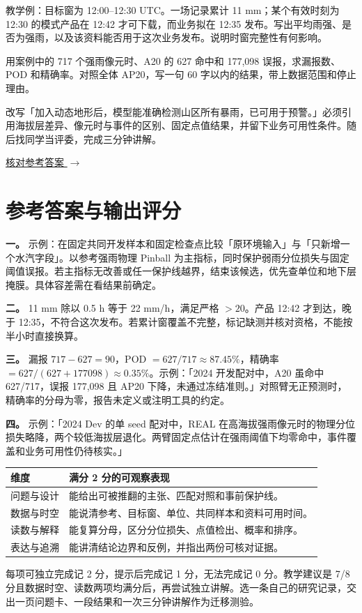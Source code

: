 教学例：目标窗为 12:00--12:30 UTC。一场记录累计 11 mm；某个有效时刻为 12:30 的模式产品在 12:42 才可下载，而业务拟在 12:35 发布。写出平均雨强、是否为强雨，以及该资料能否用于这次业务发布。说明时窗完整性有何影响。

用案例中的 717 个强雨像元时、A20 的 627 命中和 177,098 误报，求漏报数、POD 和精确率。对照全体 AP20，写一句 60 字以内的结果，带上数据范围和停止理由。

改写「加入动态地形后，模型能准确检测山区所有暴雨，已可用于预警。」必须引用海拔层差异、像元时与事件的区别、固定点值结果，并留下业务可用性条件。随后找同学当评委，完成三分钟讲解。

\bigskip
\hyperlink{answers}{核对参考答案 $\rightarrow$}

\clearpage
\hypertarget{answers}{}
\section*{参考答案与输出评分}
\textbf{一。} 示例：在固定共同开发样本和固定检查点比较「原环境输入」与「只新增一个水汽字段」。以参考强雨物理 Pinball 为主指标，同时保护弱雨分位损失与固定阈值误报。若主指标无改善或任一保护线越界，结束该候选，优先查单位和地下层掩膜。具体容差需在看结果前确定。

\textbf{二。} 11 mm 除以 0.5 h 等于 22 mm/h，满足严格 \(>20\)。产品 12:42 才到达，晚于 12:35，不符合这次发布。若累计窗覆盖不完整，标记缺测并核对资格，不能按半小时直接换算。

\textbf{三。} 漏报 \(717-627=90\)，POD \(=627/717\approx87.45\%\)，精确率 \(=627/(627+177098)\approx0.35\%\)。示例：「2024 开发配对中，A20 虽命中 627/717，误报 177,098 且 AP20 下降，未通过冻结准则。」对照臂无正预测时，精确率的分母为零，报告未定义或注明工具的约定。

\textbf{四。} 示例：「2024 Dev 的单 seed 配对中，REAL 在高海拔强雨像元时的物理分位损失略降，两个较低海拔层退化。两臂固定点估计在强雨阈值下均零命中，事件覆盖和业务可用性仍待核实。」

\begin{tabularx}{\linewidth}{@{}p{3.4cm}L@{}}
\toprule
维度 & 满分 2 分的可观察表现 \\
\midrule
问题与设计 & 能给出可被推翻的主张、匹配对照和事前保护线。 \\
数据与时空 & 能说清参考、目标窗、单位、共同样本和资料可用时间。 \\
读数与解释 & 能复算分母，区分分位损失、点值检出、概率和排序。\\
表达与追溯 & 能讲清结论边界和反例，并指出两份可核对证据。\\
\bottomrule
\end{tabularx}
每项可独立完成记 2 分，提示后完成记 1 分，无法完成记 0 分。教学建议是 7/8 分且数据时空、读数两项均满分后，再尝试独立讲解。选一条自己的研究记录，交出一页问题卡、一段结果和一次三分钟讲解作为迁移测验。

